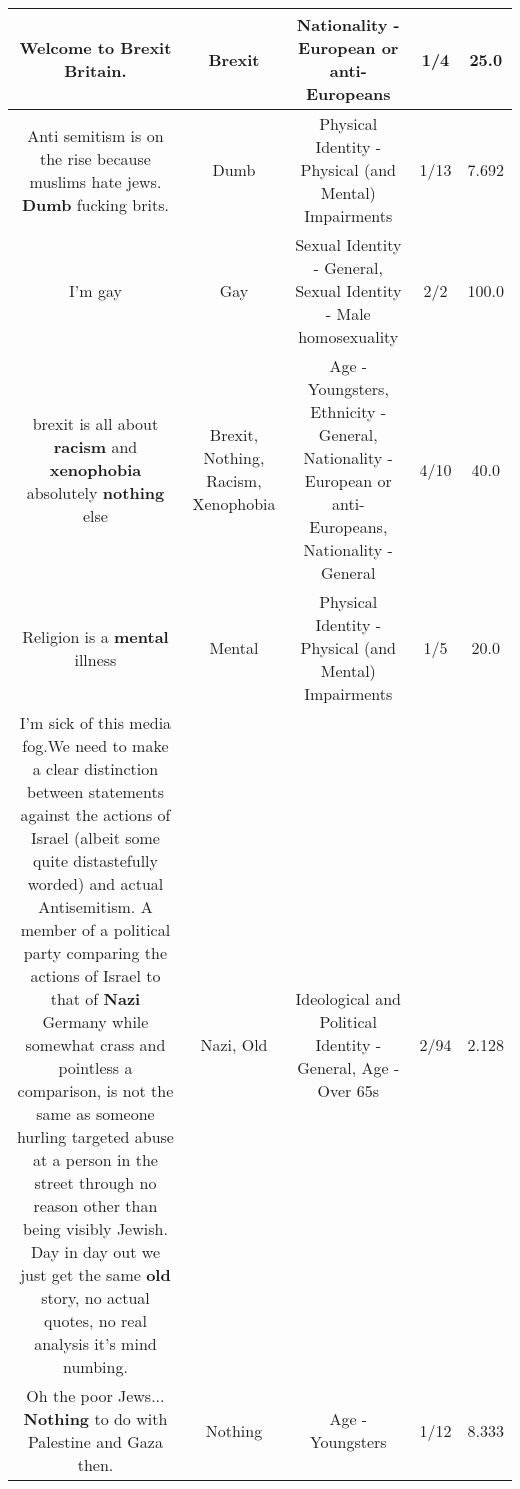 \documentclass[11pt]{article}
\newlength\mylength
\begin{document}
\begin{center}
\begin{longtable}{|C{.65\mylength}|C{.30\mylength}|C{.12\mylength}|C{.12\mylength}|C{.12\mylength}|}
  \small Welcome to \textbf{Brexit} Britain.\normalsize   & Brexit & Nationality - European or anti-Europeans & 1/4 & 25.0 \\  \hline
  \small Anti semitism is on the rise because muslims hate jews. \textbf{Dumb} fucking brits.\normalsize   & Dumb & Physical Identity - Physical (and Mental) Impairments & 1/13 & 7.692 \\  \hline
  \small I'm gay\normalsize   & Gay & Sexual Identity - General, Sexual Identity - Male homosexuality & 2/2 & 100.0 \\  \hline
  \small brexit is all about \textbf{racism} and \textbf{xenophobia} absolutely \textbf{nothing} else\normalsize   & Brexit, Nothing, Racism, Xenophobia & Age - Youngsters, Ethnicity - General, Nationality - European or anti-Europeans, Nationality - General & 4/10 & 40.0 \\  \hline
  \small Religion is a \textbf{mental} illness\normalsize   & Mental & Physical Identity - Physical (and Mental) Impairments & 1/5 & 20.0 \\  \hline
  \small I'm sick of this media fog.We need to make a clear distinction between statements against the actions of Israel (albeit some quite distastefully worded) and actual Antisemitism. A member of a political party comparing the actions of Israel to that of \textbf{Nazi} Germany while somewhat crass and pointless a comparison, is not the same as someone hurling targeted abuse at a person in the street through no reason other than being visibly Jewish. Day in day out we just get the same \textbf{old} story, no actual quotes, no real analysis it's mind numbing.\normalsize   & Nazi, Old &  Ideological and Political Identity - General, Age - Over 65s & 2/94 & 2.128 \\  \hline
  \small Oh the poor Jews... \textbf{Nothing} to do with Palestine and Gaza then.\normalsize   & Nothing & Age - Youngsters & 1/12 & 8.333 \\  \hline

\end{longtable}
\end{center}
\end{document}
